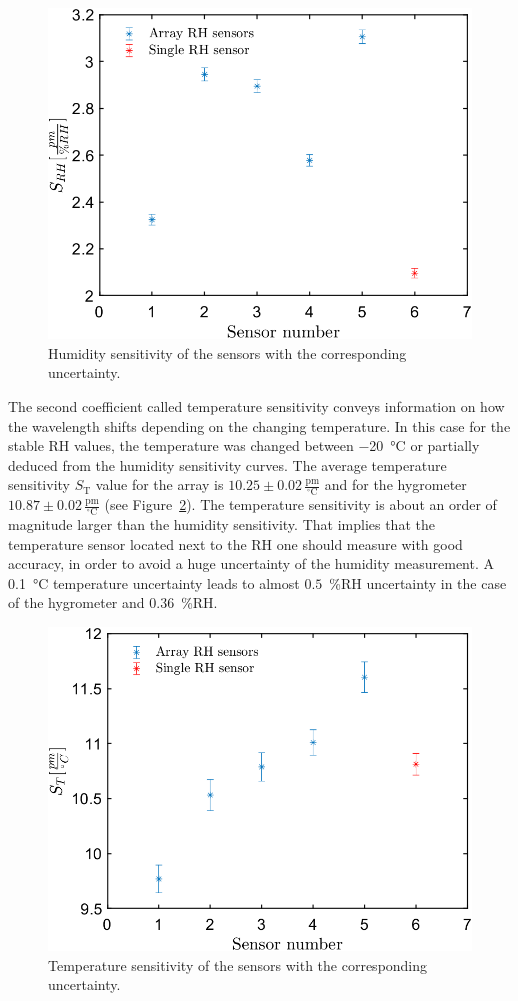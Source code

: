 \begin{figure}[!h]
\centering
\includegraphics[width=0.6\columnwidth]{Chapter5/images/comp1.png}
\caption{Humidity sensitivity of the sensors with the corresponding uncertainty.}
\label{fig_calibration}
\end{figure}
The second coefficient called temperature sensitivity conveys information on how the wavelength shifts depending on the changing temperature. In this case for the stable \gls{RH} values, the temperature was changed between \SI{-20}{\celsius} or partially deduced from the humidity sensitivity curves. 
The average temperature sensitivity $S_\text{T}$ value for the array is $10.25\pm0.02\,\mathrm{\frac{pm}{^{\circ}C}}$ and for the hygrometer $10.87\pm 0.02\,\mathrm{\frac{pm}{^{\circ}C}}$ (see Figure~\ref{fig_calibration1}). The temperature sensitivity is about an order of magnitude larger than the humidity sensitivity. That implies that the temperature sensor located next to the \gls{RH} one should measure with good accuracy, in order to avoid a huge uncertainty of the humidity measurement. A \SI{0.1}{\celsius} temperature uncertainty leads to almost $0.5$~\%RH uncertainty in the case of the hygrometer and $0.36$~\%RH. 
\begin{figure}[!h]
\centering
\includegraphics[width=0.6\columnwidth]{Chapter5/images/comp.png}
\caption{Temperature sensitivity of the sensors with the corresponding uncertainty.}
\label{fig_calibration1}
\end{figure}




